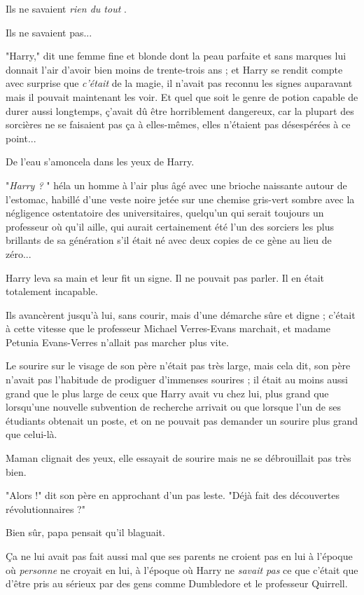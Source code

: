 Ils ne savaient \emph{rien du tout} .

Ils ne savaient pas...

"Harry," dit une femme fine et blonde dont la peau parfaite et sans marques lui donnait l'air d'avoir bien moins de trente-trois ans ; et Harry se rendit compte avec surprise que \emph{c'était}  de la magie, il n'avait pas reconnu les signes auparavant mais il pouvait maintenant les voir. Et quel que soit le genre de potion capable de durer aussi longtemps, ç'avait dû être horriblement dangereux, car la plupart des sorcières ne se faisaient pas ça à elles-mêmes, elles n'étaient pas désespérées à ce point...

De l'eau s'amoncela dans les yeux de Harry.

"\emph{Harry ?} " héla un homme à l'air plus âgé avec une brioche naissante autour de l'estomac, habillé d'une veste noire jetée sur une chemise gris-vert sombre avec la négligence ostentatoire des universitaires, quelqu'un qui serait toujours un professeur où qu'il aille, qui aurait certainement été l'un des sorciers les plus brillants de sa génération s'il était né avec deux copies de ce gène au lieu de zéro...

Harry leva sa main et leur fit un signe. Il ne pouvait pas parler. Il en était totalement incapable.

Ils avancèrent jusqu'à lui, sans courir, mais d'une démarche sûre et digne ; c'était à cette vitesse que le professeur Michael Verres-Evans marchait, et madame Petunia Evans-Verres n'allait pas marcher plus vite.

Le sourire sur le visage de son père n'était pas très large, mais cela dit, son père n'avait pas l'habitude de prodiguer d'immenses sourires ; il était au moins aussi grand que le plus large de ceux que Harry avait vu chez lui, plus grand que lorsqu'une nouvelle subvention de recherche arrivait ou que lorsque l'un de ses étudiants obtenait un poste, et on ne pouvait pas demander un sourire plus grand que celui-là.

Maman clignait des yeux, elle essayait de sourire mais ne se débrouillait pas très bien.

"Alors !" dit son père en approchant d'un pas leste. "Déjà fait des découvertes révolutionnaires ?"

Bien sûr, papa pensait qu'il blaguait.

Ça ne lui avait pas fait aussi mal que ses parents ne croient pas en lui à l'époque où \emph{personne } ne croyait en lui, à l'époque où Harry ne \emph{savait pas}  ce que c'était que d'être pris au sérieux par des gens comme Dumbledore et le professeur Quirrell.

